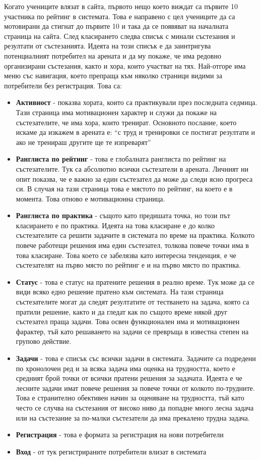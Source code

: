 \documentclass[a4paper,12pt]{article}
\begin{document}
  Когато учениците влязат в сайта, първото нещо което виждат са първите 10 участника по рейтинг в системата. Това е направено с цел учениците да са мотовирани да стигнат до първите 10 и така да се появяват на началната страница на сайта.
  След класирането следва списък с минали състезания и резултати от състезанията. Идеята на този списък е да заинтригува потенциалният потребител на арената и да му покаже, че има редовно организирани състезания, както и хора, които участват на тях.
  Най-отгоре има меню със навигация, което препраща към няколко страници видими за потребители без регистрация. Това са:
  
  \begin{itemize}
    \item \textbf{Активност} - показва хората, които са практикували през последната седмица. Тази страница има мотивационен характер и служи да покаже на състезателите, че има хора, които тренират. Основното послание, което искаме да изкажем в арената е: ``с труд и тренировки се постигат резултати и ако не тренираш другите ще те изпреварят''
    \item \textbf{Ранглиста по рейтинг} - това е глобалната ранглиста по рейтинг на състезателите. Тук са абсолютно всички състезатели в арената. Личният ни опит показва, че е важно за един състезател да може да следи ясно прогреса си. В случая на тази страница това е мястото по рейтинг, на което е в момента. Това отново е мотивационна страница.
    \item \textbf{Ранглиста по практика} - същото като предишата точка, но този път класирането е по практика. Идеята на това класиране е до колко състезателите са решити задачите в системата по време на практика. Колкото повече работещи решения има един състезател, толкова повече точки има в това класиране. Това което се забелязва като интересна тенденция, е че състезателят на първо място по рейтинг е и на първо място по практика.
    \item \textbf{Статус} - това е статус на пратените решения в реално време. Тук може да се види всяко едно решение пратено към системата. На тази страница състезателите могат да следят резултатите от тестването на задача, която са пратили решение, както и да гледат как по същото време някой друг състезател праща задачи. Това освен функционален има и мотивационен фарактер, тъй като решаването на задачи се превръща в известна степен на групово действие.
    \item \textbf{Задачи} - това е списък със всички задачи в системата. Задачите са подредени по хронолочен ред и за всяка задача има оценка на трудността, което е средният брой точки от всички пратени решения за задачата. Идеята е че лесните задачи имат повече решения за повече точки от колкото по-трудните. Това е странително обективен начин за оценяване на трудността, тъй като често се случва на състезания от високо ниво да попадне много лесна задача или на състезание за по-малки състезатели да има прекалено трудна задача.
    \item \textbf{Регистрация} - това е формата за регистрация на нови потребители
    \item \textbf{Вход} - от тук регистрираните потребители влизат в системата
  \end{itemize}
\end{document}
